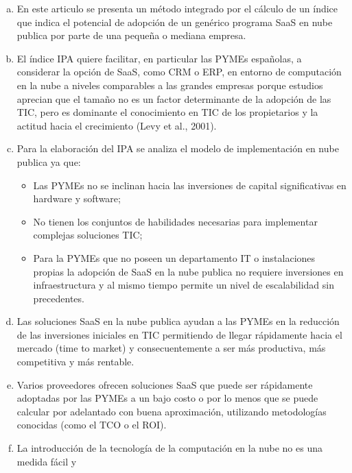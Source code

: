 \begin{enumerate}[a.]
    \item En este articulo se presenta un método integrado por el cálculo de un
          índice que indica el potencial de adopción de un genérico programa SaaS
          en nube publica por parte de una pequeña o mediana empresa.
    \item El índice IPA quiere facilitar, en particular las PYMEs españolas, a
          considerar la opción de SaaS, como CRM o ERP, en entorno de computación en la nube
          a niveles comparables a las grandes empresas porque estudios aprecian que el
          tamaño no es un factor determinante de la adopción de las TIC, pero es
          dominante el conocimiento en TIC de los propietarios y la actitud hacia
          el crecimiento (Levy et al., 2001).
    \item Para la elaboración del IPA se analiza el modelo de implementación en
          nube publica ya que:
          \begin{itemize}
              \item Las PYMEs no se inclinan hacia las inversiones de capital
                    significativas en hardware y software;
              \item No tienen los conjuntos de habilidades necesarias para implementar
                    complejas soluciones TIC;
              \item Para la PYMEs que no poseen un departamento IT o instalaciones
                    propias la adopción de SaaS en la nube publica no requiere
                    inversiones en infraestructura y al mismo tiempo permite un nivel de
                    escalabilidad sin precedentes.
          \end{itemize}
      \item Las soluciones SaaS en la nube publica ayudan a las PYMEs en la
            reducción de las inversiones iniciales en TIC permitiendo de llegar
            rápidamente hacia el mercado (time to market) y consecuentemente a
            ser más productiva, más competitiva y más rentable.
      \item Varios proveedores ofrecen soluciones SaaS que puede ser rápidamente
            adoptadas por las PYMEs a un bajo costo o por lo menos que se puede
            calcular por adelantado con buena aproximación, utilizando metodologías
            conocidas (como el TCO o el ROI).
      \item La introducción de la tecnología de la computación en la nube no es una medida fácil y

\end{enumerate}
